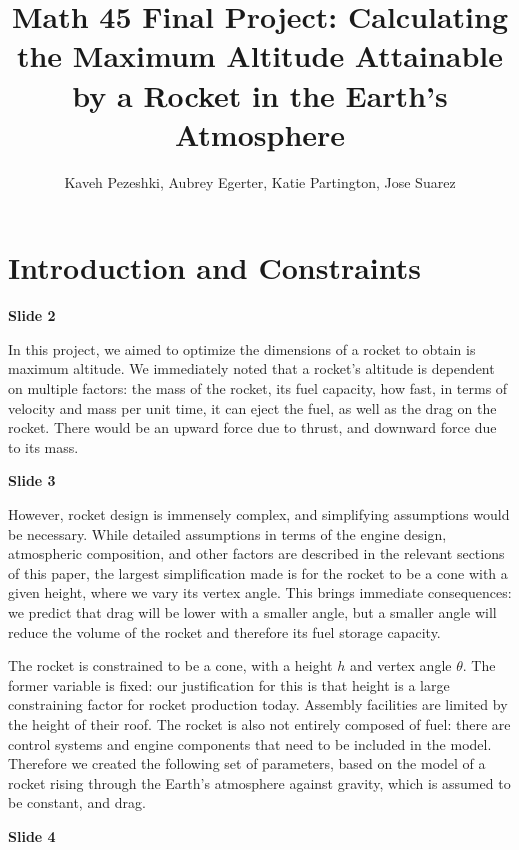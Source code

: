 \documentclass[]{article}
\title{Math 45 Final Project: Calculating the Maximum Altitude Attainable by a Rocket in the Earth's Atmosphere}
\author{Kaveh Pezeshki, Aubrey Egerter, Katie Partington, Jose Suarez}
\begin{document}
\maketitle

\section{Introduction and Constraints}

\hspace{0.2in}\textbf{Slide 2} 

\hspace{-0.2in}In this project, we aimed to optimize the dimensions of a rocket to obtain is maximum altitude. We immediately noted that a rocket's altitude is dependent on multiple factors: the mass of the rocket, its fuel capacity, how fast, in terms of velocity and mass per unit time, it can eject the fuel, as well as the drag on the rocket. There would be an upward force due to thrust, and downward force due to its mass.

\textbf{Slide 3}

However, rocket design is immensely complex, and simplifying assumptions would be necessary. While detailed assumptions in terms of the engine design, atmospheric composition, and other factors are described in the relevant sections of this paper, the largest simplification made is for the rocket to be a cone with a given height, where we vary its vertex angle. This brings immediate consequences: we predict that drag will be lower with a smaller angle, but a smaller angle will reduce the volume of the rocket and therefore its fuel storage capacity.

The rocket is constrained to be a cone, with a  height $h$ and vertex angle $\theta$. The former variable is fixed: our justification for this is that height is a large constraining factor for rocket production today. Assembly facilities are limited by the height of their roof. The rocket is also not entirely composed of fuel: there are control systems and engine components that need to be included in the model. Therefore we created the following set of parameters, based on the model of a rocket rising through the Earth's atmosphere against gravity, which is assumed to be constant, and drag.

\textbf{Slide 4}
\end{document}
